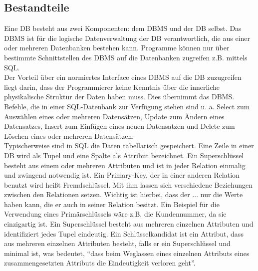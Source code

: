 \subsection*{Bestandteile}
\label{ssec:Datenbanken_Bestandteile}
Eine \acf{DB} besteht aus zwei Komponenten: dem \acf{DBMS} und der \acs{DB} selbst. 
Das \ac{DBMS} ist für die logische Datenverwaltung der \acs{DB} verantwortlich, die aus einer oder mehreren Datenbanken bestehen kann. 
Programme können nur über bestimmte Schnittstellen des \acs{DBMS} auf die Datenbanken zugreifen z.B. mittels \acs{SQL}.\autocite{Book_DB_1}\autocite{Book_DB_2}\\
Der Vorteil über ein normiertes Interface eines \acs{DBMS} auf die \acs{DB} zuzugreifen liegt darin, dass der Programmierer keine Kenntnis über die innerliche physikalische Struktur der Daten haben muss. 
Dies übernimmt das \acs{DBMS}.\autocite[vgl. S.4][]{Schicker2017DatenbankenSQL} \\
Befehle, die in einer \acs{SQL}-Datenbank zur Verfügung stehen sind u. a. Select zum Auswählen eines oder mehreren Datensätzen, Update zum Ändern eines Datensatzes, Insert zum Einfügen eines neuen Datensatzen und Delete zum Löschen eines oder mehreren Datensätzen. \\
Typischerweise sind in \acs{SQL} die Daten tabellarisch gespeichert. 
Eine Zeile in einer \acs{DB} wird als Tupel und eine Spalte als Attribut bezeichnet.\autocite[vgl. S.4][]{Schicker2017DatenbankenSQL}
Ein Superschlüssel besteht aus einem oder mehreren Attributen und ist in jeder Relation einmalig und zwingend notwendig ist.
Ein Primary-Key, der in einer anderen Relation benutzt wird heißt Fremdschlüssel.
Mit ihm lassen sich verschiedene Beziehungen zwischen den Relationen setzen.
Wichtig ist hierbei, dass der ... nur die Werte haben kann, die er auch in seiner Relation besitzt.
Ein Beispiel für die Verwendung eines Primärschlüssels wäre z.B. die Kundennummer, da sie einzigartig ist.
Ein Superschlüssel besteht aus mehreren einzelnen Attributen und identifiziert jedes Tupel eindeutig.
Ein Schlüsselkandidat ist ein Attribut, dass aus mehreren einzelnen Attributen besteht, falls er ein Superschlüssel und minimal ist, was bedeutet, \enquote{dass beim Weglassen eines einzelnen Attributs eines zusammengesetzten
Attributs die Eindeutigkeit verloren geht}.\autocite[vgl. S.31 f.][]{Schicker2017DatenbankenSQL}

\autocite{rf-psqllicense}